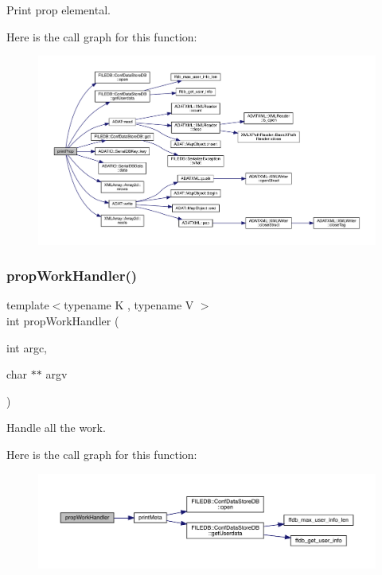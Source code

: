 Print prop elemental. 

Here is the call graph for this function\+:
\nopagebreak
\begin{figure}[H]
\begin{center}
\leavevmode
\includegraphics[width=350pt]{d5/d55/adat-devel_2main_2dbutil_2dbutil_8cc_a6ff051251360484ce00ee0688f3636b3_cgraph}
\end{center}
\end{figure}
\mbox{\label{adat-devel_2main_2dbutil_2dbutil_8cc_afa664cbd0d7ec40f584e2f7b9a5f9c37}} 
\subsubsection{\texorpdfstring{propWorkHandler()}{propWorkHandler()}}
{\footnotesize\ttfamily template$<$typename K , typename V $>$ \\
int prop\+Work\+Handler (\begin{DoxyParamCaption}\item[{int}]{argc,  }\item[{char $\ast$$\ast$}]{argv }\end{DoxyParamCaption})}



Handle all the work. 

Here is the call graph for this function\+:
\nopagebreak
\begin{figure}[H]
\begin{center}
\leavevmode
\includegraphics[width=350pt]{d5/d55/adat-devel_2main_2dbutil_2dbutil_8cc_afa664cbd0d7ec40f584e2f7b9a5f9c37_cgraph}
\end{center}
\end{figure}
\mbox{\label{adat-devel_2main_2dbutil_2dbutil_8cc_a115ac046e9c4d74d76cec46ec78c3f9b}} 
